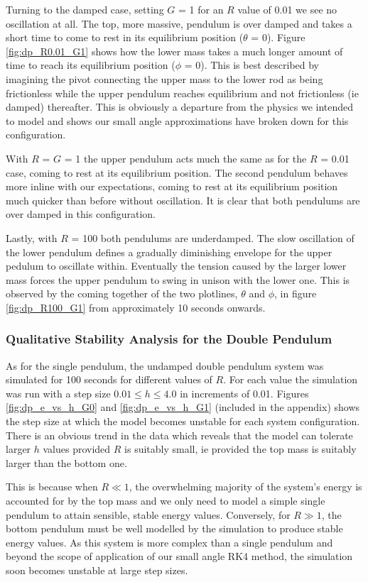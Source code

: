 \documentclass[11pt]{article}
\begin{document}
Turning to the damped case, setting $G$ = 1 for an $R$ value of 0.01 we see no oscillation at all. The top, more massive, pendulum is over damped and takes a short time to come to rest in its equilibrium position ($\theta$ = 0). Figure \ref{fig:dp_R0.01_G1} shows how the lower mass takes a much longer amount of time to reach its equilibrium position ($\phi$ = 0). This is best described by imagining the pivot connecting the upper mass to the lower rod as being frictionless while the upper pendulum reaches equilibrium and not frictionless (ie damped) thereafter. This is obviously a departure from the physics we intended to model and shows our small angle approximations have broken down for this configuration.

With $R$ = $G$ = 1 the upper pendulum acts much the same as for the $R$ = 0.01 case, coming to rest at its equilibrium position. The second pendulum behaves more inline with our expectations, coming to rest at its equilibrium position much quicker than before without oscillation. It is clear that both pendulums are over damped in this configuration.

Lastly, with $R$ = 100 both pendulums are underdamped. The slow oscillation of the lower pendulum defines a gradually diminishing envelope for the upper pedulum to oscillate within. Eventually the tension caused by the larger lower mass forces the upper pendulum to swing in unison with the lower one. This is observed by the coming together of the two plotlines, $\theta$ and $\phi$, in figure \ref{fig:dp_R100_G1} from approximately 10 seconds onwards.

\subsubsection*{Qualitative Stability Analysis for the Double Pendulum}
As for the single pendulum, the undamped double pendulum system was simulated for 100 seconds for different values of $R$. For each value the simulation was run with a step size $0.01 \leq h \leq 4.0$ in increments of 0.01. Figures \ref{fig:dp_e_vs_h_G0} and \ref{fig:dp_e_vs_h_G1} (included in the appendix) shows the step size at which the model becomes unstable for each system configuration. There is an obvious trend in the data which reveals that the model can tolerate larger $h$ values provided $R$ is suitably small, ie provided the top mass is suitably larger than the bottom one.

This is because when $R \ll 1$, the overwhelming majority of the system's energy is accounted for by the top mass and we only need to model a simple single pendulum to attain sensible, stable energy values. Conversely, for $R \gg 1$, the bottom pendulum must be well modelled by the simulation to produce stable energy values. As this system is more complex than a single pendulum and beyond the scope of application of our small angle RK4 method, the simulation soon becomes unstable at large step sizes.
\end{document}
